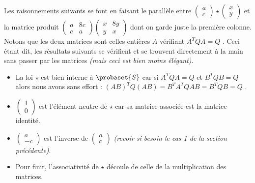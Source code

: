 \medskip

Les raisonnements suivants se font en faisant le parallèle entre 
$\begin{pmatrix} 
  a \\ 
  c 
\end{pmatrix}
\star
\begin{pmatrix} 
  x \\ 
  y 
\end{pmatrix}$
et la matrice produit
$\begin{pmatrix} 
  a & 8c \\ 
  c & a 
\end{pmatrix}
\begin{pmatrix} 
  x & 8y \\ 
  y & x 
\end{pmatrix}$
dont on garde juste la première colonne.
Notons que les deux matrices sont celles entières $A$ vérifiant $A^T Q A = Q$ . 
Ceci étant dit, les résultats suivants se vérifient et se trouvent directement à la main sans passer par les matrices \textit{(mais ceci est bien moins élégant)}.


\begin{itemize}[label=\small\textbullet]
	\item La loi $\star$ est bien interne à $\probaset{S}$ car si $A^T Q A = Q$ et $B^T Q B = Q$ alors nous avons sans effort :
	$(AB)^T Q (AB) = B^T A^T Q A B = B^T Q B = Q$ .


	\medskip
	\item
	$\begin{pmatrix} 
	  1 \\ 
	  0 
	\end{pmatrix}$
	est l'élément neutre de $\star$ car sa matrice associée est la matrice identité.


	\medskip
	\item
	$\begin{pmatrix} 
	  a  \\ 
	  -c 
	\end{pmatrix}$
	est l'inverse de
	$\begin{pmatrix} 
	  a \\ 
	  c 
	\end{pmatrix}$
	\textit{(revoir si besoin le cas 1 de la section précédente)}.


	\medskip
	\item Pour finir, l'associativité de $\star$ découle de celle de la multiplication des matrices.
\end{itemize}


